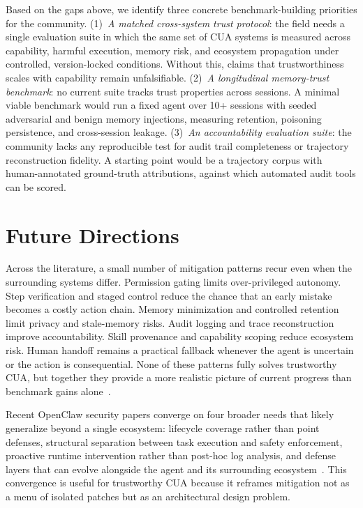 Based on the gaps above, we identify three concrete benchmark-building priorities for the community.
(1)~\emph{A matched cross-system trust protocol}: the field needs a single evaluation suite in which the same set of CUA systems is measured across capability, harmful execution, memory risk, and ecosystem propagation under controlled, version-locked conditions. Without this, claims that trustworthiness scales with capability remain unfalsifiable.
(2)~\emph{A longitudinal memory-trust benchmark}: no current suite tracks trust properties across sessions. A minimal viable benchmark would run a fixed agent over 10+ sessions with seeded adversarial and benign memory injections, measuring retention, poisoning persistence, and cross-session leakage.
(3)~\emph{An accountability evaluation suite}: the community lacks any reproducible test for audit trail completeness or trajectory reconstruction fidelity. A starting point would be a trajectory corpus with human-annotated ground-truth attributions, against which automated audit tools can be scored.

\section{Future Directions}
\label{sec:future-directions}

Across the literature, a small number of mitigation patterns recur even when the surrounding systems differ. Permission gating limits over-privileged autonomy. Step verification and staged control reduce the chance that an early mistake becomes a costly action chain. Memory minimization and controlled retention limit privacy and stale-memory risks. Audit logging and trace reconstruction improve accountability. Skill provenance and capability scoping reduce ecosystem risk. Human handoff remains a practical fallback whenever the agent is uncertain or the action is consequential. None of these patterns fully solves trustworthy CUA, but together they provide a more realistic picture of current progress than benchmark gains alone~\cite{steve2025,safearena2025,hou2025mcp,clawaudit2026}.

Recent OpenClaw security papers converge on four broader needs that likely generalize beyond a single ecosystem: lifecycle coverage rather than point defenses, structural separation between task execution and safety enforcement, proactive runtime intervention rather than post-hoc log analysis, and defense layers that can evolve alongside the agent and its surrounding ecosystem~\cite{tamingopenclaw2026,openclawprism2026,agentprivsep2026,clawkeeper2026}. This convergence is useful for trustworthy CUA because it reframes mitigation not as a menu of isolated patches but as an architectural design problem.


